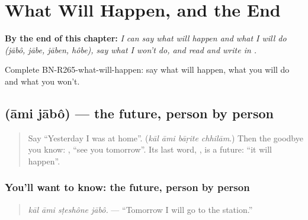 
\chapter{What Will Happen, and the End}
\label{ch:bn-what-will-happen-and-the-end}

\begin{chapteropening}
\textbf{By the end of this chapter:} \emph{I can say what will happen and what I will do (jābô, jābe, jāben, hôbe), say what I won't do, and read and write  in .}

Complete BN-R265-what-will-happen: say what will happen, what you will do and what you won't.
\end{chapteropening}

\section[\texorpdfstring{\bn{আমি} \bn{যাব} (āmi jābô)}{আমি যাব (āmi jābô)}]{  (āmi jābô) — the future, person by person}

\label{lesson:BN-C265-jabo}



\begin{quote}
Say \textquotedblleft{}Yesterday I was at home\textquotedblright{}. (\emph{kāl āmi bāṛite chhilām}.) Then the goodbye you know: \textbf{  }, \textquotedblleft{}see you tomorrow\textquotedblright{}. Its last word, \textbf{}, is a future: \textquotedblleft{}it will happen\textquotedblright{}.
\end{quote}

\subsection*{You'll want to know: the future, person by person}
\begin{quote}
\textbf{   }
\end{quote}

\begin{quote}
\emph{kāl āmi sṭeshône jābô.} — \textquotedblleft{}Tomorrow I will go to the station.\textquotedblright{}
\end{quote}

